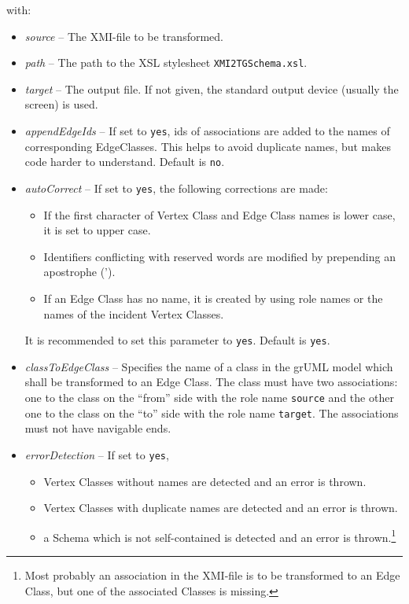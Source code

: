 \documentclass[a4paper]{article}
\begin{document}
	with:
	\begin{itemize}
		\item \emph{source} -- The XMI-file to be transformed.
		\item \emph{path} -- The path to the XSL stylesheet \texttt{XMI2TGSchema.xsl}.
		\item \emph{target} -- The output file. If not given, the standard output device (usually the screen) is used.
	\end{itemize}
	\begin{itemize}
		\item \emph{appendEdgeIds} -- If set to \texttt{yes}, ids of associations are added to the names of corresponding EdgeClasses. This helps to avoid duplicate names, but makes code harder to understand. Default is \texttt{no}.
		\item \emph{autoCorrect} -- If set to \texttt{yes}, the following corrections are made:
		\begin{itemize}
			\item If the first character of Vertex Class and Edge Class names is lower case, it is set to upper case.
			\item Identifiers conflicting with reserved words are modified by prepending an apostrophe (').
			\item If an Edge Class has no name, it is created by using role names or the names of the incident Vertex Classes. 
		\end{itemize}
		It is recommended to set this parameter to \texttt{yes}. Default is \texttt{yes}.
		\item \emph{classToEdgeClass} -- Specifies the name of a class in the grUML model which shall be transformed to an Edge Class. The class must have two associations: one to the class on the ``from'' side with the role name \texttt{source} and the other one to the class on the ``to'' side with the role name \texttt{target}. The associations must not have navigable ends.
		\item \emph{errorDetection} -- If set to \texttt{yes},
		\begin{itemize}
			\item Vertex Classes without names are detected and an error is thrown.
			\item Vertex Classes with duplicate names are detected and an error is thrown.
			\item a Schema which is not self-contained is detected and an error is thrown.\footnote{Most probably an association in the XMI-file is to be transformed to an Edge Class, but one of the associated Classes is missing.}

\end{itemize}
\end{itemize}
\end{document}
